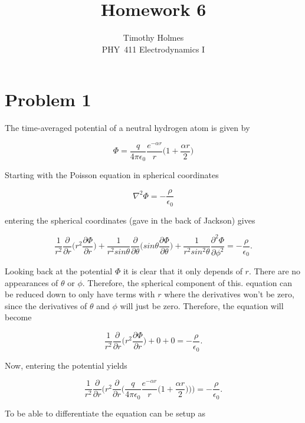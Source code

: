 \documentclass[11pt]{article}
\newcommand{\HWnum}{6}
\newcommand{\Subject}{PHY}
\begin{document}

\title{Homework {\HWnum}}
\author{Timothy Holmes \\ \Subject~411 Electrodynamics I}

\maketitle

\section*{Problem 1}

The time-averaged potential of a neutral hydrogen atom is given by

$$
\Phi = \frac{q}{4\pi \epsilon_{0}} \frac{e^{-\alpha r}}{r}\Bigg(1 + \frac{\alpha r}{2}\Bigg)
$$

Starting with the Poisson equation in spherical coordinates

$$
\nabla^{2} \Phi = -\frac{\rho}{\epsilon_{0}}
$$

entering the spherical coordinates (gave in the back of Jackson) gives

$$
\frac{1}{r^{2}}\frac{\partial}{\partial r} \Bigg(r^{2} \frac{\partial \Phi}{\partial r} \Bigg) + \frac{1}{r^{2}sin\theta} \frac{\partial}{\partial \theta} \Bigg(sin\theta \frac{\partial \Phi}{\partial \theta} \Bigg) + \frac{1}{r^{2}sin^{2}\theta} \frac{\partial^{2}\Phi}{\partial \phi^{2}} = -\frac{\rho}{\epsilon_{0}}.
$$

Looking back at the potential $\Phi$ it is clear that it only depends of $r$. There are no appearances of $\theta$ or $\phi$. Therefore, the spherical component of this. equation can be reduced down to only have terms with $r$ where the derivatives won't be zero, since the derivatives of $\theta$ and $\phi$ will just be zero. Therefore, the equation will become

$$
\frac{1}{r^{2}}\frac{\partial}{\partial r}  \Bigg(r^{2} \frac{\partial \Phi}{\partial r} \Bigg) + 0 + 0 = -\frac{\rho}{\epsilon_{0}}.
$$

Now, entering the potential yields 

$$
\frac{1}{r^{2}}\frac{\partial}{\partial r}  \Bigg(r^{2} \frac{\partial}{\partial r} \Bigg( \frac{q}{4\pi \epsilon_{0}} \frac{e^{-\alpha r}}{r}\Bigg(1 + \frac{\alpha r}{2}\Bigg) \Bigg)\Bigg) = -\frac{\rho}{\epsilon_{0}}.
$$

To be able to differentiate the equation can be setup as
\end{document}
